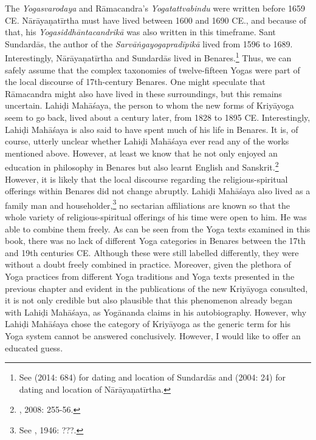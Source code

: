 The \textit{Yogasvarodaya} and Rāmacandra's \textit{Yogatattvabindu} were written before 1659 CE. Nārāyaṇatīrtha must have lived between 1600 and 1690 CE., and because of that, his \textit{Yogasiddhāntacandrikā} was also written in this timeframe. Sant Sundardās, the author of the \textit{Sarvāṅgayogapradīpikā} lived from 1596 to 1689. Interestingly, Nārāyaṇatīrtha and Sundardās lived in Benares.\footnote{See \citeauthor{burger2014sarvangayogapradipika} (2014: 684) for dating and location of Sundardās and \citeauthor{penna2004} (2004: 24) for dating and location of Nārāyaṇatīrtha.} Thus, we can safely assume that the complex taxonomies of twelve-fifteen Yogas were part of the local discourse of 17th-century Benares. One might speculate that Rāmacandra might also have lived in these surroundings, but this remains uncertain. Lahiḍi Mahāśaya, the person to whom the new forms of Kriyāyoga seem to go back, lived about a century later, from 1828 to 1895 CE. Interestingly, Lahiḍi Mahāśaya is also said to have spent much of his life in Benares. It is, of course, utterly unclear whether Lahiḍi Mahāśaya ever read any of the works mentioned above. However, at least we know that he not only enjoyed an education in philosophy in Benares but also learnt English and Sanskrit.\footnote{\citeauthor{jones2008encyclopedia}, 2008: 255-56.} However, it is likely that the local discourse regarding the religious-spiritual offerings within Benares did not change abruptly. Lahiḍi Mahāśaya also lived as a family man and householder,\footnote{See \citeauthor{autobioyogi}, 1946: ???.} no sectarian affiliations are known so that the whole variety of religious-spiritual offerings of his time were open to him. He was able to combine them freely. As can be seen from the Yoga texts examined in this book, there was no lack of different Yoga categories in Benares between the 17th and 19th centuries CE. Although these were still labelled differently, they were without a doubt freely combined in practice. Moreover, given the plethora of Yoga practices from different Yoga traditions and Yoga texts presented in the previous chapter and evident in the publications of the new Kriyāyoga consulted, it is not only credible but also plausible that this phenomenon already began with Lahiḍi Mahāśaya, as Yogānanda claims in his autobiography. However, why Lahiḍi Mahāśaya chose the category of Kriyāyoga as the generic term for his Yoga system cannot be answered conclusively. However, I would like to offer an educated guess.

